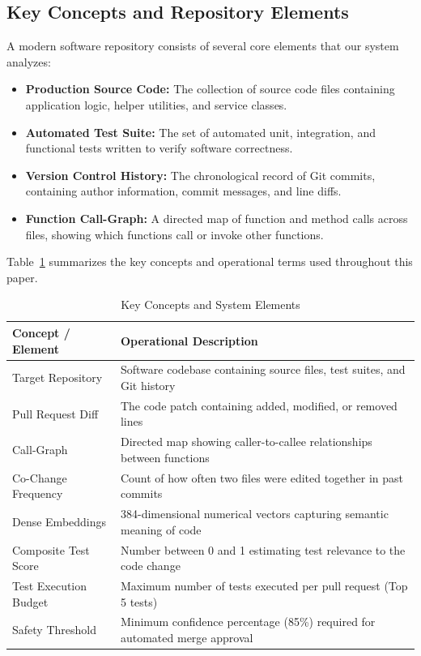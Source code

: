 \documentclass[12pt,onecolumn,draftclsnofoot]{IEEEtran}
\begin{document}
\subsection{Key Concepts and Repository Elements}
A modern software repository consists of several core elements that our system analyzes:
\begin{itemize}
    \item \textbf{Production Source Code:} The collection of source code files containing application logic, helper utilities, and service classes.
    \item \textbf{Automated Test Suite:} The set of automated unit, integration, and functional tests written to verify software correctness.
    \item \textbf{Version Control History:} The chronological record of Git commits, containing author information, commit messages, and line diffs.
    \item \textbf{Function Call-Graph:} A directed map of function and method calls across files, showing which functions call or invoke other functions.
\end{itemize}

Table~\ref{tab:notation} summarizes the key concepts and operational terms used throughout this paper.

\begin{table}[h]
\centering
\caption{Key Concepts and System Elements}
\label{tab:notation}
\begin{tabular}{@{}ll@{}}
\toprule
\textbf{Concept / Element} & \textbf{Operational Description} \\ \midrule
Target Repository & Software codebase containing source files, test suites, and Git history \\
Pull Request Diff & The code patch containing added, modified, or removed lines \\
Call-Graph & Directed map showing caller-to-callee relationships between functions \\
Co-Change Frequency & Count of how often two files were edited together in past commits \\
Dense Embeddings & 384-dimensional numerical vectors capturing semantic meaning of code \\
Composite Test Score & Number between 0 and 1 estimating test relevance to the code change \\
Test Execution Budget & Maximum number of tests executed per pull request (Top 5 tests) \\
Safety Threshold & Minimum confidence percentage (85\%) required for automated merge approval \\ \bottomrule
\end{tabular}
\end{table}
\end{document}
